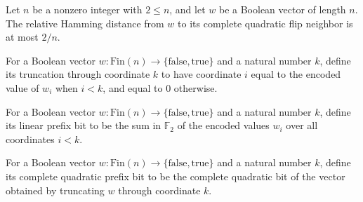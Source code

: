 \begin{theorem}
\label{FABL.relativeHammingDist_completeQuadraticFlipNeighbor_le_two_div}
\leanok
{}
Let $n$ be a nonzero integer with $2\le n$, and let $w$ be a Boolean vector of length
$n$. The relative Hamming distance from $w$ to its complete quadratic flip neighbor is
at most $2/n$.
\end{theorem}

\begin{definition}
\label{FABL.completeQuadraticTruncation}
\leanok
{}
For a Boolean vector $w \colon \mathrm{Fin}(n) \to
\{\mathrm{false},\mathrm{true}\}$ and a natural number $k$, define its truncation
through coordinate $k$ to have coordinate $i$ equal to the encoded value of $w_i$ when
$i<k$, and equal to $0$ otherwise.
\end{definition}

\begin{definition}
\label{FABL.completeQuadraticLinearPrefixBit}
\leanok
{}
For a Boolean vector $w \colon \mathrm{Fin}(n) \to
\{\mathrm{false},\mathrm{true}\}$ and a natural number $k$, define its linear prefix
bit to be the sum in $\mathbb{F}_2$ of the encoded values $w_i$ over all coordinates
$i<k$.
\end{definition}

\begin{definition}
\label{FABL.completeQuadraticPrefixBit}
\leanok
{}
For a Boolean vector $w \colon \mathrm{Fin}(n) \to
\{\mathrm{false},\mathrm{true}\}$ and a natural number $k$, define its complete
quadratic prefix bit to be the complete quadratic bit of the vector obtained by
truncating $w$ through coordinate $k$.
\end{definition}

